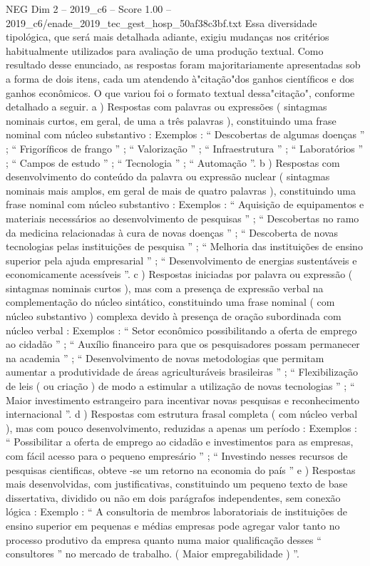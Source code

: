 \begin{textsample}{NEG Dim 2 – 2019\_c6 – Score 1.00 – 2019\_c6/enade\_2019\_tec\_gest\_hosp\_50af38c3bf.txt}
Essa diversidade tipológica, que será mais detalhada adiante, exigiu mudanças nos critérios habitualmente utilizados para avaliação de uma produção textual.
Como resultado desse enunciado, as respostas foram majoritariamente apresentadas sob a forma de dois itens, cada um atendendo à"citação"dos ganhos científicos e dos ganhos econômicos.
O que variou foi o formato textual dessa"citação", conforme detalhado a seguir. a ) Respostas com palavras ou expressões ( sintagmas nominais curtos, em geral, de uma a três palavras ), constituindo uma frase nominal com núcleo substantivo : Exemplos : “ Descobertas de algumas doenças ” ; “ Frigoríficos de frango ” ; “ Valorização ” ; “ Infraestrutura ” ; “ Laboratórios ” ; “ Campos de estudo ” ; “ Tecnologia ” ; “ Automação ”. b ) Respostas com desenvolvimento do conteúdo da palavra ou expressão nuclear ( sintagmas nominais mais amplos, em geral de mais de quatro palavras ), constituindo uma frase nominal com núcleo substantivo : Exemplos : “ Aquisição de equipamentos e materiais necessários ao desenvolvimento de pesquisas ” ; “ Descobertas no ramo da medicina relacionadas à cura de novas doenças ” ; “ Descoberta de novas tecnologias pelas instituições de pesquisa ” ; “ Melhoria das instituições de ensino superior pela ajuda empresarial ” ; “ Desenvolvimento de energias sustentáveis e economicamente acessíveis ”. c ) Respostas iniciadas por palavra ou expressão ( sintagmas nominais curtos ), mas com a presença de expressão verbal na complementação do núcleo sintático, constituindo uma frase nominal ( com núcleo substantivo ) complexa devido à presença de oração subordinada com núcleo verbal : Exemplos : “ Setor econômico possibilitando a oferta de emprego ao cidadão ” ; “ Auxílio financeiro para que os pesquisadores possam permanecer na academia ” ; “ Desenvolvimento de novas metodologias que permitam aumentar a produtividade de áreas agriculturáveis brasileiras ” ; “ Flexibilização de leis ( ou criação ) de modo a estimular a utilização de novas tecnologias ” ; “ Maior investimento estrangeiro para incentivar novas pesquisas e reconhecimento internacional ”. d ) Respostas com estrutura frasal completa ( com núcleo verbal ), mas com pouco desenvolvimento, reduzidas a apenas um período : Exemplos : “ Possibilitar a oferta de emprego ao cidadão e investimentos para as empresas, com fácil acesso para o pequeno empresário ” ; “ Investindo nesses recursos de pesquisas cientificas, obteve -se um retorno na economia do país ” e ) Respostas mais desenvolvidas, com justificativas, constituindo um pequeno texto de base dissertativa, dividido ou não em dois parágrafos independentes, sem conexão lógica : Exemplo : “ A consultoria de membros laboratoriais de instituições de ensino superior em pequenas e médias empresas pode agregar valor tanto no processo produtivo da empresa quanto numa maior qualificação desses “ consultores ” no mercado de trabalho. ( Maior empregabilidade ) ”.

\end{textsample}
